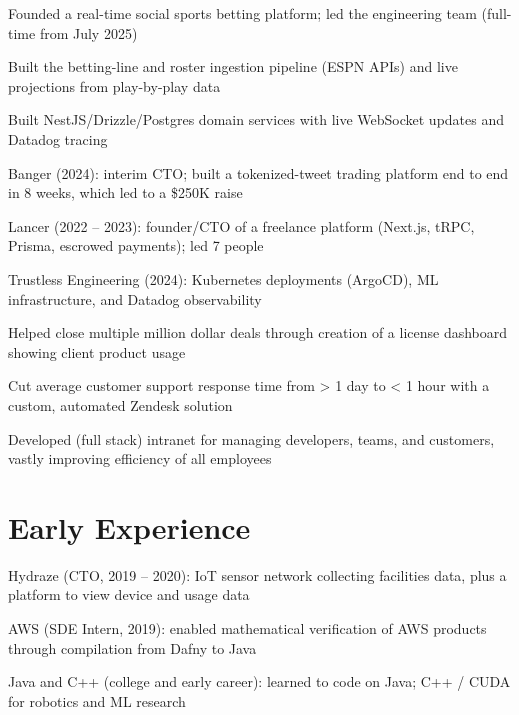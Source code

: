 \documentclass[print]{jack-resume}
\begin{document}
\begin{tightemize}
    \item Founded a real-time social sports betting platform; led the engineering team (full-time from July 2025)
    \item Built the betting-line and roster ingestion pipeline (ESPN APIs) and live projections from play-by-play data
    \item Built NestJS/Drizzle/Postgres domain services with live WebSocket updates and Datadog tracing
\end{tightemize}
\sectionsep

\begin{tightemize}
    \item Banger (2024): interim CTO; built a tokenized-tweet trading platform end to end in 8 weeks, which led to a \$250K raise
    \item Lancer (2022 -- 2023): founder/CTO of a freelance platform (Next.js, tRPC, Prisma, escrowed payments); led 7 people
    \item Trustless Engineering (2024): Kubernetes deployments (ArgoCD), ML infrastructure, and Datadog observability
\end{tightemize}
\sectionsep

\begin{tightemize}
    \item Helped close multiple million dollar deals through creation of a license dashboard showing client product usage
    \item Cut average customer support response time from > 1 day to < 1 hour with a custom, automated Zendesk solution
    \item Developed (full stack) intranet for managing developers, teams, and customers, vastly improving efficiency of all employees
\end{tightemize}
\sectionsep

\section{Early Experience}
\vspace{1.4em}
\begin{tightemize}
    \item Hydraze (CTO, 2019 -- 2020): IoT sensor network collecting facilities data, plus a platform to view device and usage data
    \item AWS (SDE Intern, 2019): enabled mathematical verification of AWS products through compilation from Dafny to Java
    \item Java and C++ (college and early career): learned to code on Java; C++ / CUDA for robotics and ML research
\end{tightemize}
\sectionsep
\end{document}
